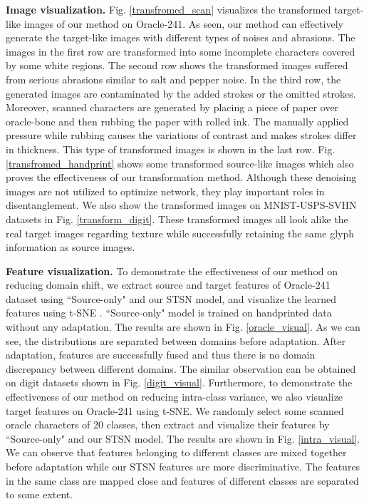 \documentclass[10pt,journal,compsoc,twocolumn ]{IEEEtran}
\begin{document}
\textbf{Image visualization.} Fig. \ref{transfromed_scan} visualizes the transformed target-like images of our method on Oracle-241. %
As seen, our method can effectively generate the target-like images with different types of noises and abrasions. The images in the first row are transformed into some incomplete characters covered by some white regions. The second row shows the transformed images suffered from serious abrasions similar to salt and pepper noise. In the third row, the generated images are contaminated by the added strokes or the omitted strokes. Moreover, scanned characters are generated by placing a piece of paper over oracle-bone and then rubbing the paper with rolled ink. The manually applied pressure while rubbing causes the variations of contrast and makes strokes differ in thickness. This type of transformed images is shown in the last row. %
Fig. \ref{transfromed_handprint} shows some transformed source-like images which also proves the effectiveness of our transformation method. Although these denoising images are not utilized to optimize network, they play important roles in disentanglement. We also show the transformed images on MNIST-USPS-SVHN datasets in Fig. \ref{transform_digit}. These transformed images all look alike the real target images regarding texture while successfully retaining the same glyph information as source images.

\textbf{Feature visualization.} To demonstrate the effectiveness of our method on reducing domain shift, we extract source and target features of Oracle-241 dataset using ``Source-only" and our STSN model, and visualize the learned features using t-SNE \cite{maaten2008visualizing}. ``Source-only" model is trained on handprinted data without any adaptation. The results are shown in Fig. \ref{oracle_visual}. As we can see, the distributions are separated between domains before adaptation. %
After adaptation, features are successfully fused and thus there is no domain discrepancy between different domains. The similar observation can be obtained on digit datasets shown in Fig. \ref{digit_visual}. Furthermore, to demonstrate the effectiveness of our method on reducing intra-class variance, we also visualize target features on Oracle-241 using t-SNE. We randomly select some scanned oracle characters of 20 classes, then extract and visualize their features by ``Source-only" and our STSN model. The results are shown in Fig. \ref{intra_visual}. We can observe that features belonging to different classes are mixed together before adaptation while our STSN features are more discriminative. The features in the same class are mapped close and features of different classes are separated to some extent.
\end{document}
